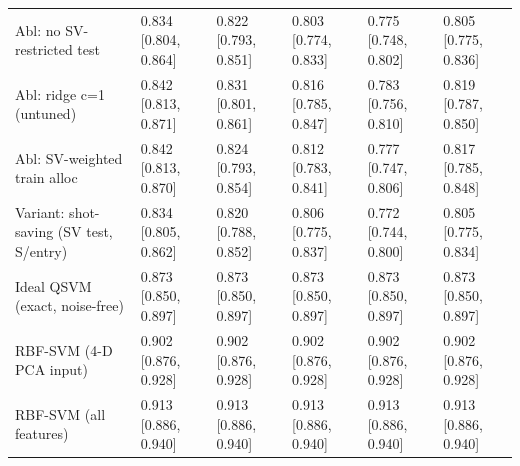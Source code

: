 \begin{table}[t]
\begin{tabular}{llllll}
Abl: no SV-restricted test & 0.834 [0.804, 0.864] & 0.822 [0.793, 0.851] & 0.803 [0.774, 0.833] & 0.775 [0.748, 0.802] & 0.805 [0.775, 0.836] \\
Abl: ridge c=1 (untuned) & 0.842 [0.813, 0.871] & 0.831 [0.801, 0.861] & 0.816 [0.785, 0.847] & 0.783 [0.756, 0.810] & 0.819 [0.787, 0.850] \\
Abl: SV-weighted train alloc & 0.842 [0.813, 0.870] & 0.824 [0.793, 0.854] & 0.812 [0.783, 0.841] & 0.777 [0.747, 0.806] & 0.817 [0.785, 0.848] \\
Variant: shot-saving (SV test, S/entry) & 0.834 [0.805, 0.862] & 0.820 [0.788, 0.852] & 0.806 [0.775, 0.837] & 0.772 [0.744, 0.800] & 0.805 [0.775, 0.834] \\
Ideal QSVM (exact, noise-free) & 0.873 [0.850, 0.897] & 0.873 [0.850, 0.897] & 0.873 [0.850, 0.897] & 0.873 [0.850, 0.897] & 0.873 [0.850, 0.897] \\
RBF-SVM (4-D PCA input) & 0.902 [0.876, 0.928] & 0.902 [0.876, 0.928] & 0.902 [0.876, 0.928] & 0.902 [0.876, 0.928] & 0.902 [0.876, 0.928] \\
RBF-SVM (all features) & 0.913 [0.886, 0.940] & 0.913 [0.886, 0.940] & 0.913 [0.886, 0.940] & 0.913 [0.886, 0.940] & 0.913 [0.886, 0.940] \\
\hline
\end{tabular}
\end{table}